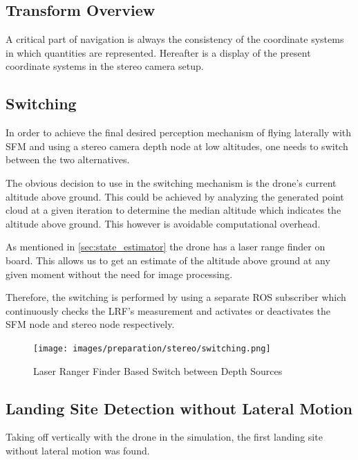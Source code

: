 \subsection{Transform Overview}

A critical part of navigation is always the consistency of the coordinate systems in which quantities are represented. Hereafter is a display of the present coordinate systems in the stereo camera setup.

\subsection{Switching}

In order to achieve the final desired perception mechanism of flying laterally with SFM and using a stereo camera depth node at low altitudes, one needs to switch between the two alternatives.

The obvious decision to use in the switching mechanism is the drone's current altitude above ground. This could be achieved by analyzing the generated point cloud at a given iteration to determine the median altitude which indicates the altitude above ground. This however is avoidable computational overhead.

As mentioned in \cref{sec:state_estimator} the drone has a laser range finder on board. This allows us to get an estimate of the altitude above ground at any given moment without the need for image processing.

Therefore, the switching is performed by using a separate ROS subscriber which continuously checks the LRF's measurement and activates or deactivates the SFM node and stereo node respectively.

\clearpage %
\begin{figure}
    \centering
    \texttt{[image: images/preparation/stereo/switching.png]}
    \caption{Laser Ranger Finder Based Switch between Depth Sources}
\end{figure}

\subsection{Landing Site Detection without Lateral Motion}

Taking off vertically with the drone in the simulation, the first landing site without lateral motion was found.

